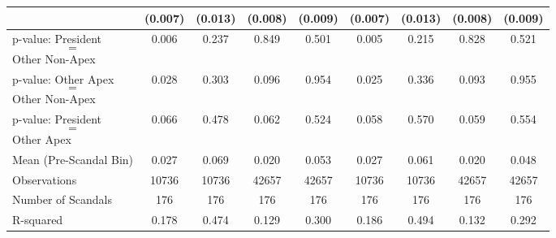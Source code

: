 {\begin{tabular}{l*{8}{c}}
            &     (0.007)         &     (0.013)         &     (0.008)         &     (0.009)         &     (0.007)         &     (0.013)         &     (0.008)         &     (0.009)         \\
\midrule
p-value: President $$=$$ Other Non-Apex&       0.006         &       0.237         &       0.849         &       0.501         &       0.005         &       0.215         &       0.828         &       0.521         \\
p-value: Other Apex $$=$$ Other Non-Apex&       0.028         &       0.303         &       0.096         &       0.954         &       0.025         &       0.336         &       0.093         &       0.955         \\
p-value: President $$=$$ Other Apex&       0.066         &       0.478         &       0.062         &       0.524         &       0.058         &       0.570         &       0.059         &       0.554         \\
Mean (Pre-Scandal Bin)&       0.027         &       0.069         &       0.020         &       0.053         &       0.027         &       0.061         &       0.020         &       0.048         \\
Observations&       10736         &       10736         &       42657         &       42657         &       10736         &       10736         &       42657         &       42657         \\
Number of Scandals&         176         &         176         &         176         &         176         &         176         &         176         &         176         &         176         \\
R-squared   &       0.178         &       0.474         &       0.129         &       0.300         &       0.186         &       0.494         &       0.132         &       0.292         \\
\bottomrule
\end{tabular}
}
